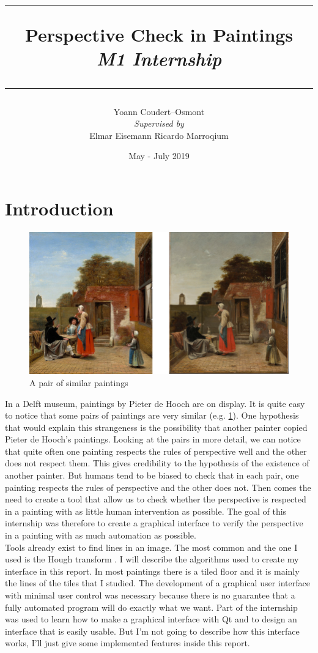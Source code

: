 \documentclass[11pt]{article}
\title{
	\rule{\linewidth}{0.4mm}
	\textbf{Perspective Check in Paintings} \\
	\textit{M1 Internship}
	\rule{\linewidth}{0.6mm} \vspace{-10mm}
}
\author{
	Yoann Coudert--Osmont \\[1.5mm]
	\textit{Supervised by} \\
	Elmar Eisemann \qquad Ricardo Marroqium \\[2mm]
}
\date{May - July 2019}
\begin{document}
	\maketitle
	
	\section*{Introduction}
	
	\begin{figure}
		\centering
		\includegraphics[scale=1.25]{paintings_pair.jpg}
		\caption{A pair of similar paintings}
		\label{im:pair}
	\end{figure}

	In a Delft museum, paintings by Pieter de Hooch are on display. It is quite easy to notice that some pairs of paintings are very similar (e.g. \figurename \ref{im:pair}). One hypothesis that would explain this strangeness is the possibility that another painter copied Pieter de Hooch's paintings. Looking at the pairs in more detail, we can notice that quite often one painting respects the rules of perspective well and the other does not respect them. This gives credibility to the hypothesis of the existence of another painter. But humans tend to be biased to check that in each pair, one painting respects the rules of perspective and the other does not. Then comes the need to create a tool that allow us to check whether the perspective is respected in a painting with as little human intervention as possible. The goal of this internship was therefore to create a graphical interface to verify the perspective in a painting with as much automation as possible. \\
	Tools already exist to find lines in an image. The most common and the one I used is the Hough transform \cite{hough}. I will describe the algorithms used to create my interface in this report. In most paintings there is a tiled floor and it is mainly the lines of the tiles that I studied. The development of a graphical user interface with minimal user control was necessary because there is no guarantee that a fully automated program will do exactly what we want. Part of the internship was used to learn how to make a graphical interface with Qt and to design an interface that is easily usable. But I'm not going to describe how this interface works, I'll just give some implemented features inside this report.
\end{document}
